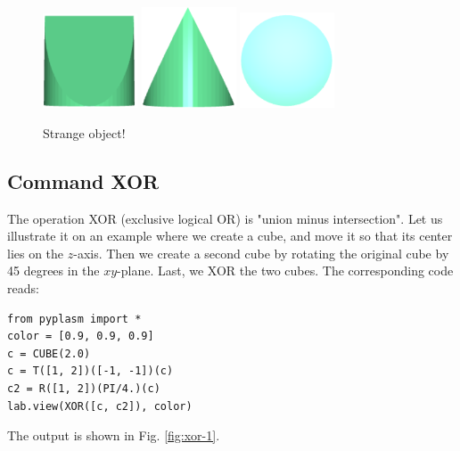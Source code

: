 \documentclass[article,A4,12pt]{llncs}
\begin{document}
\begin{figure}[!ht]
\begin{center}
\includegraphics[width=0.25\textwidth]{img/int-1a.png}
\includegraphics[width=0.25\textwidth]{img/int-1b.png}
\includegraphics[width=0.25\textwidth]{img/int-1c.png}
\end{center}
\vspace{-2mm}
\caption{Strange object!}
\label{fig:int-1}
\end{figure}


\subsection{Command XOR}

The operation XOR (exclusive logical OR) is "union minus intersection". Let us illustrate it 
on an example where we create a cube, and move it so that its center lies on the $z$-axis. Then 
we create a second cube by rotating the original cube by 45 degrees in the $xy$-plane. Last,
we XOR the two cubes. The corresponding code reads:
 
\begin{verbatim}
from pyplasm import *
color = [0.9, 0.9, 0.9]
c = CUBE(2.0)
c = T([1, 2])([-1, -1])(c)
c2 = R([1, 2])(PI/4.)(c)
lab.view(XOR([c, c2]), color) 
\end{verbatim}
The output is shown in Fig. \ref{fig:xor-1}.
\end{document}
